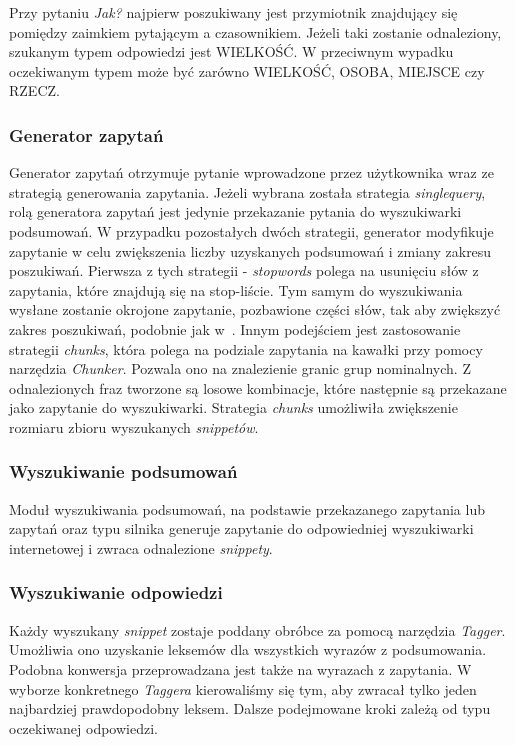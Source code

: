 Przy pytaniu \emph{Jak?} najpierw poszukiwany jest przymiotnik znajdujący się pomiędzy zaimkiem pytającym a czasownikiem. Jeżeli taki zostanie odnaleziony, szukanym typem odpowiedzi jest WIELKOŚĆ. W przeciwnym wypadku oczekiwanym typem może być zarówno WIELKOŚĆ, OSOBA, MIEJSCE czy RZECZ. 

\subsubsection{Generator zapytań}
Generator zapytań otrzymuje pytanie wprowadzone przez użytkownika wraz ze strategią generowania zapytania. Jeżeli wybrana została strategia \emph{singlequery}, rolą generatora zapytań jest jedynie przekazanie pytania do wyszukiwarki podsumowań. W przypadku pozostałych dwóch strategii, generator modyfikuje zapytanie w celu  zwiększenia liczby uzyskanych podsumowań i zmiany zakresu poszukiwań. Pierwsza z tych strategii - \emph{stopwords} polega na usunięciu słów z zapytania, które znajdują się na stop-liście. Tym samym do wyszukiwania wysłane zostanie okrojone zapytanie, pozbawione części słów, tak aby zwiększyć zakres poszukiwań, podobnie jak w~\cite{brill2002analysis}. Innym podejściem jest zastosowanie strategii \emph{chunks}, która polega na podziale zapytania na kawałki przy pomocy narzędzia \emph{Chunker}. Pozwala ono na znalezienie granic grup nominalnych. Z odnalezionych fraz tworzone są losowe kombinacje, które następnie są przekazane jako zapytanie do wyszukiwarki. Strategia \emph{chunks} umożliwiła zwiększenie rozmiaru zbioru wyszukanych \emph{snippetów}.
 
\subsubsection{Wyszukiwanie podsumowań}
Moduł wyszukiwania podsumowań, na podstawie przekazanego zapytania lub zapytań oraz typu silnika generuje zapytanie do odpowiedniej wyszukiwarki internetowej i zwraca odnalezione \emph{snippety}.

\subsubsection{Wyszukiwanie odpowiedzi}

Każdy wyszukany \emph{snippet} zostaje poddany obróbce za pomocą narzędzia \emph{Tagger}. Umożliwia ono uzyskanie leksemów dla wszystkich wyrazów z podsumowania. Podobna konwersja przeprowadzana jest także na wyrazach z zapytania. W wyborze konkretnego \emph{Taggera} kierowaliśmy się tym, aby zwracał tylko jeden najbardziej prawdopodobny leksem. Dalsze podejmowane kroki zależą od typu oczekiwanej odpowiedzi.

